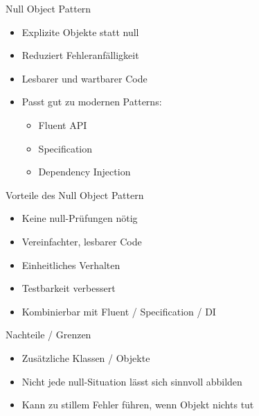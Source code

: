 \begin{frame}{Null Object Pattern}
    \begin{itemize}
        \item Explizite Objekte statt null
        \item Reduziert Fehleranfälligkeit
        \item Lesbarer und wartbarer Code
        \item Passt gut zu modernen Patterns:
        \begin{itemize}
            \item Fluent API
            \item Specification
            \item Dependency Injection
        \end{itemize}
    \end{itemize}
\end{frame}

\begin{frame}{Vorteile des Null Object Pattern}
    \begin{itemize}
        \item Keine null-Prüfungen nötig
        \item Vereinfachter, lesbarer Code
        \item Einheitliches Verhalten
        \item Testbarkeit verbessert
        \item Kombinierbar mit Fluent / Specification / DI
    \end{itemize}
\end{frame}

\begin{frame}{Nachteile / Grenzen}
    \begin{itemize}
        \item Zusätzliche Klassen / Objekte
        \item Nicht jede null-Situation lässt sich sinnvoll abbilden
        \item Kann zu stillem Fehler führen, wenn Objekt nichts tut
    \end{itemize}
\end{frame}
